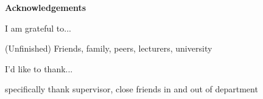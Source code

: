 \thispagestyle{empty}

\begin{center}
    {\LARGE\bf Acknowledgements}
\end{center}

I am grateful to...

(Unfinished)
Friends, family, peers, lecturers, university

I'd like to thank...

specifically thank supervisor, close friends in and out of department
